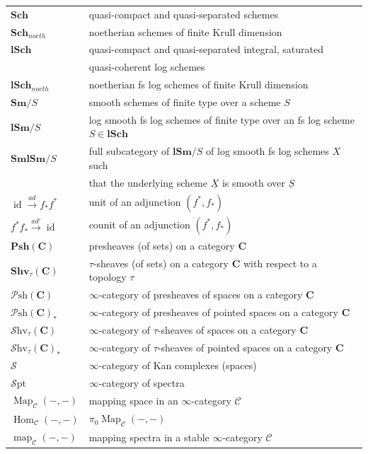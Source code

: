 \documentclass[11pt, a4paper]{amsart}
\theoremstyle{definition}
\numberwithin{equation}{subsection}
\newcommand{\Sch}{\mathbf{Sch}}
\newcommand{\lSch}{\mathbf{lSch}}
\newcommand{\Sm}{\mathbf{Sm}}
\newcommand{\lSm}{\mathbf{lSm}}
\newcommand{\SmlSm}{\mathbf{SmlSm}}
\newcommand{\Shv}{\mathbf{Shv}}
\newcommand{\Psh}{\mathbf{Psh}}
\newcommand{\id}{\operatorname{id}}   			%
\renewcommand{\hom}{\operatorname{Hom}}				 %
\newcommand{\bC}{\mathbf{C}}
\newcommand{\infSpc}{\mathcal{S}}
\newcommand{\infPsh}{\mathcal{P}\mathrm{sh}}
\newcommand{\infShv}{\mathcal{S}\mathrm{hv}}
\newcommand{\infSpt}{\mathcal{S}\mathrm{pt}}
\newcommand{\Map}{\operatorname{Map}}
\newcommand{\infC}{\mathcal{C}}
\newcommand{\map}{\operatorname{map}}
\begin{document}
\begin{tabular}{l|l}
$\Sch$ &  quasi-compact and quasi-separated schemes
\\
$\Sch_{noeth}$ & noetherian schemes of finite Krull dimension
\\
$\lSch$ & quasi-compact and quasi-separated integral, saturated \\ &  quasi-coherent log schemes
\\
$\lSch_{noeth}$ & noetherian fs log schemes of finite Krull dimension
\\
$\Sm/S$ &  smooth schemes of finite type over a scheme $S$
\\
$\lSm/S$ &  log smooth fs log schemes of finite type over an fs log scheme $S\in \lSch$
\\
$\SmlSm/S$ &  full subcategory of $\lSm/S$ of log smooth fs log schemes $X$ such
\\ &
that the underlying scheme $\underline{X}$ is smooth over $\underline{S}$
\\
$\id\xrightarrow{ad} f_*f^*$ &  unit of an adjunction $(f^*,f_*)$
\\
$f^*f_*\xrightarrow{ad'}\id$ &  counit of an adjunction $(f^*,f_*)$
\\
$\Psh(\bC)$ &  presheaves (of sets) on a category $\bC$
\\
$\Shv_\tau(\bC)$ &  $\tau$-sheaves (of sets) on a category $\bC$ with respect to a topology $\tau$ 
\\
$\infPsh(\bC)$ &  $\infty$-category of presheaves of spaces on a category $\bC$
\\
$\infPsh(\bC)_*$ &  $\infty$-category of presheaves of pointed spaces on a category $\bC$
\\
$\infShv_\tau(\bC)$ &  $\infty$-category of $\tau$-sheaves of spaces on a category $\bC$
\\
$\infShv_\tau(\bC)_*$ &  $\infty$-category of $\tau$-sheaves of pointed spaces on a category $\bC$
\\
$\infSpc$ &  $\infty$-category of Kan complexes (spaces)
\\
$\infSpt$ &  $\infty$-category of spectra
\\
$\Map_{\infC}(-,-)$ & mapping space in an $\infty$-category $\infC$
\\
$\hom_{\infC}(-,-)$ & $\pi_0\Map_{\infC}(-,-)$
\\
$\map_{\infC}(-,-)$ & mapping spectra in a stable $\infty$-category $\infC$
\end{tabular}

\
\end{document}
